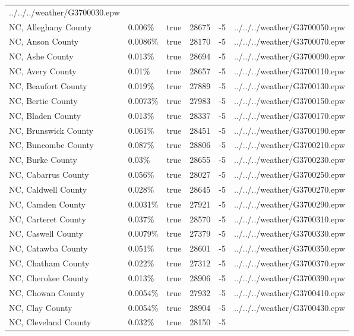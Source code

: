 \begin{longtable}[]{@{}llllll@{}}
../../../weather/G3700030.epw \\
NC, Alleghany County & 0.006\% & true & 28675 & -5 &
../../../weather/G3700050.epw \\
NC, Anson County & 0.0086\% & true & 28170 & -5 &
../../../weather/G3700070.epw \\
NC, Ashe County & 0.013\% & true & 28694 & -5 &
../../../weather/G3700090.epw \\
NC, Avery County & 0.01\% & true & 28657 & -5 &
../../../weather/G3700110.epw \\
NC, Beaufort County & 0.019\% & true & 27889 & -5 &
../../../weather/G3700130.epw \\
NC, Bertie County & 0.0073\% & true & 27983 & -5 &
../../../weather/G3700150.epw \\
NC, Bladen County & 0.013\% & true & 28337 & -5 &
../../../weather/G3700170.epw \\
NC, Brunswick County & 0.061\% & true & 28451 & -5 &
../../../weather/G3700190.epw \\
NC, Buncombe County & 0.087\% & true & 28806 & -5 &
../../../weather/G3700210.epw \\
NC, Burke County & 0.03\% & true & 28655 & -5 &
../../../weather/G3700230.epw \\
NC, Cabarrus County & 0.056\% & true & 28027 & -5 &
../../../weather/G3700250.epw \\
NC, Caldwell County & 0.028\% & true & 28645 & -5 &
../../../weather/G3700270.epw \\
NC, Camden County & 0.0031\% & true & 27921 & -5 &
../../../weather/G3700290.epw \\
NC, Carteret County & 0.037\% & true & 28570 & -5 &
../../../weather/G3700310.epw \\
NC, Caswell County & 0.0079\% & true & 27379 & -5 &
../../../weather/G3700330.epw \\
NC, Catawba County & 0.051\% & true & 28601 & -5 &
../../../weather/G3700350.epw \\
NC, Chatham County & 0.022\% & true & 27312 & -5 &
../../../weather/G3700370.epw \\
NC, Cherokee County & 0.013\% & true & 28906 & -5 &
../../../weather/G3700390.epw \\
NC, Chowan County & 0.0054\% & true & 27932 & -5 &
../../../weather/G3700410.epw \\
NC, Clay County & 0.0054\% & true & 28904 & -5 &
../../../weather/G3700430.epw \\
NC, Cleveland County & 0.032\% & true & 28150 & -5 &

\end{longtable}
